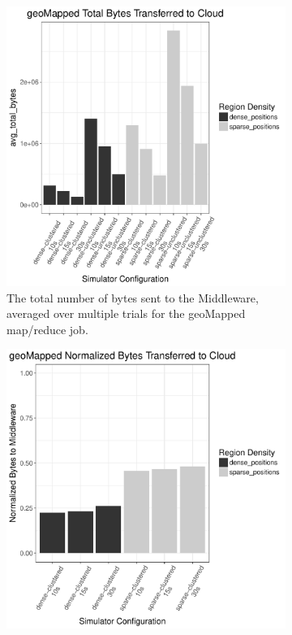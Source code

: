 \documentclass{thesis}
\begin{document}
    \begin{figure}
        \begin{subfigure}[h]{0.45\textwidth}
            \centering
            \includegraphics[width=\textwidth]{binImages/geoMapped-runplot.pdf}
            \caption{The total number of bytes sent to the Middleware,
            averaged over multiple trials for the geoMapped map/reduce job.}
        \end{subfigure}
        \begin{subfigure}[h]{0.45\textwidth}
            \centering
            \includegraphics[width=\textwidth]{binImages/geoMapped-runplot-normalized.pdf}

\end{subfigure}
\end{figure}
\end{document}
